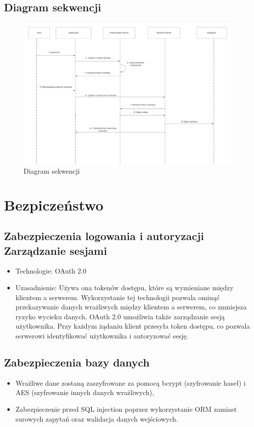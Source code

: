 \documentclass[12pt,titlepage]{article}
\begin{document}
\subsection{Diagram sekwencji}

\begin{figure}[!h]
    \centering
    \includegraphics[width=1\textwidth]{img/Diagram sekwencji.pdf}
    \caption{Diagram sekwencji}
    \label{fig:mesh1}
\end{figure}

\section{Bezpiczeństwo}
\subsection{Zabezpieczenia logowania i autoryzacji Zarządzanie sesjami}
\begin{itemize}
    \item Technologie: OAuth 2.0
    \item Uzasadnienie: Używa ona tokenów dostępu, które są wymieniane między klientem a serwerem. Wykorzystanie tej technologii pozwala ominąć przekazywanie danych wrażliwych między klientem a serwerem, co zmniejsza ryzyko wycieku danych. OAuth 2.0 umożliwia także zarządzanie sesją użytkownika. Przy każdym żądaniu klient przesyła token dostępu, co pozwala serwerowi identyfikować użytkownika i autoryzować sesję.
\end{itemize}
\subsection{Zabezpieczenia bazy danych}
\begin{itemize}
    \item Wrażliwe dane zostaną zaszyfrowane za pomocą bcrypt (szyfrowanie haseł) i AES (szyfrowanie innych danych wrażliwych),
    \item Zabezpieczenie przed SQL injection poprzez wykorzystanie ORM zamiast surowych zapytań oraz walidacja danych wejściowych.
\end{itemize}
\end{document}
